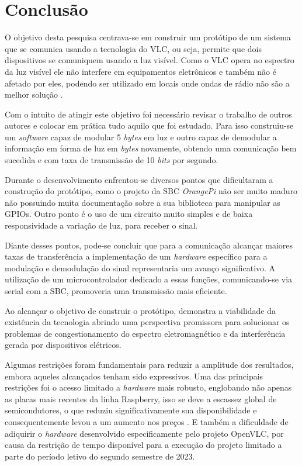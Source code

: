 \section{Conclusão}

O objetivo desta pesquisa centrava-se em construir um protótipo de um sistema que se comunica usando a tecnologia do VLC, ou seja, permite que dois dispositivos se comuniquem usando a luz visível. Como o VLC opera no espectro da luz visível ele não interfere em equipamentos eletrônicos e também não é afetado por eles, podendo ser utilizado em locais onde ondas de rádio não são a melhor solução \cite{matheus2017comunicaccao}.

Com o intuito de atingir este objetivo foi necessário revisar o trabalho de outros autores e colocar em prática tudo aquilo que foi estudado. Para isso construiu-se um \textit{software} capaz de modular 5 \textit{bytes} em luz e outro capaz de demodular a informação em forma de luz em \textit{bytes} novamente, obtendo uma comunicação bem sucedida e com taxa de transmissão de 10 \textit{bits} por segundo.

Durante o desenvolvimento enfrentou-se diversos pontos que dificultaram a construção do protótipo, como o projeto da SBC \textit{OrangePi} não ser muito maduro não possuindo muita documentação sobre a sua biblioteca para manipular as GPIOs. Outro ponto é o uso de um circuito muito simples e de baixa responsividade a variação de luz, para receber o sinal.

Diante desses pontos, pode-se concluir que para a comunicação alcançar maiores taxas de transferência a implementação de um \textit{hardware} específico para a modulação e demodulação do sinal representaria um avanço significativo. A utilização de um microcontrolador dedicado a essas funções, comunicando-se via serial com a SBC, promoveria uma transmissão mais eficiente.

Ao alcançar o objetivo de construir o protótipo, demonstra a viabilidade da existência da tecnologia abrindo uma perspectiva promissora para solucionar os problemas de congestionamento do espectro eletromagnético e da interferência gerada por dispositivos elétricos. 

Algumas restrições foram fundamentais para reduzir a amplitude dos resultados, embora aqueles alcançados tenham sido expressivos. Uma das principais restrições foi o acesso limitado a \textit{hardware} mais robusto, englobando não apenas as placas mais recentes da linha Raspberry, isso se deve a escassez global de semicondutores, o que reduziu significativamente sua disponibilidade e consequentemente levou a um aumento nos preços \cite{zeng_2022}. E também a dificuldade de adiquirir o \textit{hardware} desenvolvido especificamente pelo projeto OpenVLC, por causa da restrição de tempo disponível para a execução do projeto limitado a parte do período letivo do segundo semestre de 2023.
